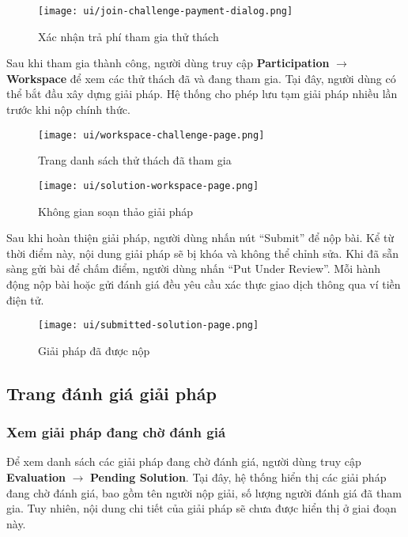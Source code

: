 \begin{figure}[H]
  \centering
  \texttt{[image: ui/join-challenge-payment-dialog.png]}
  \caption{Xác nhận trả phí tham gia thử thách}
  \label{fig:join-challenge-payment-dialog}
\end{figure}

Sau khi tham gia thành công, người dùng truy cập \textbf{Participation} $\rightarrow$ \textbf{Workspace} để xem các thử thách đã và đang tham gia.  
Tại đây, người dùng có thể bắt đầu xây dựng giải pháp. Hệ thống cho phép lưu tạm giải pháp nhiều lần trước khi nộp chính thức.

\begin{figure}[H]
  \centering
  \texttt{[image: ui/workspace-challenge-page.png]}
  \caption{Trang danh sách thử thách đã tham gia}
  \label{fig:workspace-challenge-page}
\end{figure}

\begin{figure}[H]
  \centering
  \texttt{[image: ui/solution-workspace-page.png]}
  \caption{Không gian soạn thảo giải pháp}
  \label{fig:solution-workspace-page}
\end{figure}

Sau khi hoàn thiện giải pháp, người dùng nhấn nút ``Submit'' để nộp bài. Kể từ thời điểm này, nội dung giải pháp sẽ bị khóa và không thể chỉnh sửa.
Khi đã sẵn sàng gửi bài để chấm điểm, người dùng nhấn ``Put Under Review''. Mỗi hành động nộp bài hoặc gửi đánh giá đều yêu cầu xác thực giao dịch thông qua ví tiền điện tử.

\begin{figure}[H]
  \centering
  \texttt{[image: ui/submitted-solution-page.png]}
  \caption{Giải pháp đã được nộp}
  \label{fig:submitted-solution-page}
\end{figure}

\subsection{Trang đánh giá giải pháp}

\subsubsection{Xem giải pháp đang chờ đánh giá}

Để xem danh sách các giải pháp đang chờ đánh giá, người dùng truy cập \textbf{Evaluation} $\rightarrow$ \textbf{Pending Solution}.  
Tại đây, hệ thống hiển thị các giải pháp đang chờ đánh giá, bao gồm tên người nộp giải, số lượng người đánh giá đã tham gia.  
Tuy nhiên, nội dung chi tiết của giải pháp sẽ chưa được hiển thị ở giai đoạn này.

